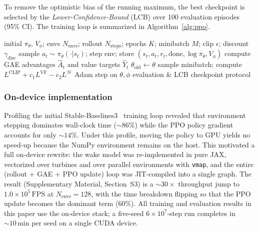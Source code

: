 \documentclass[final,5p,times]{elsarticle}
\begin{document}
To remove the optimistic bias of the running maximum, the best checkpoint is selected by the \emph{Lower-Confidence-Bound} (LCB) over 100 evaluation episodes (95\% CI). The training loop is summarized in Algorithm~\ref{alg:ppo}.

\begin{algorithm}[t]
\caption{PPO for cooperative yaw control (on-device JAX/NNX).}
\label{alg:ppo}
\begin{algorithmic}[1]
\Require initial $\pi_\theta$, $V_\phi$; envs $N_\mathrm{envs}$; rollout $N_\mathrm{steps}$; epochs $K$; minibatch $M$; clip $\epsilon$; discount $\gamma_\mathrm{disc}$
    \State sample $a_t\sim\pi_\theta(\cdot|s_t)$; step env; store $(s_t,a_t,r_t,\text{done},\log\pi_\theta,V_\phi)$
  \EndFor
  \State compute GAE advantages $\hat A_t$ and value targets $\hat Y_t$
  \State $\theta_\mathrm{old}\leftarrow\theta$
    \State sample minibatch; compute $L^\mathrm{CLIP}+c_1 L^\mathrm{VF}-c_2 L^\mathcal{H}$
    \State Adam step on $\theta,\phi$
  \EndFor
  \State evaluation \& LCB checkpoint protocol
\EndFor
\end{algorithmic}
\end{algorithm}

\subsubsection{On-device implementation}\label{sec:impl}
Profiling the initial Stable-Baselines3~\citep{Raffin2021} training loop revealed that environment stepping dominates wall-clock time ($\sim\!86\%$) while the PPO policy gradient accounts for only $\sim\!14\%$. Under this profile, moving the policy to GPU yields no speed-up because the NumPy environment remains on the host. This motivated a full on-device rewrite: the wake model was re-implemented in pure JAX, vectorized over turbines and over parallel environments with \texttt{vmap}, and the entire (rollout + GAE + PPO update) loop was JIT-compiled into a single graph. The result (Supplementary Material, Section~S3) is a $\sim\!30\!\times$ throughput jump to $1.0\!\times\!10^{5}\,\mathrm{FPS}$ at $N_\mathrm{envs}\!=\!128$, with the time breakdown flipping so that the PPO update becomes the dominant term ($60\%$). All training and evaluation results in this paper use the on-device stack; a five-seed $6\!\times\!10^{7}$-step run completes in ${\sim}10\,\mathrm{min}$ per seed on a single CUDA device.
\end{document}
